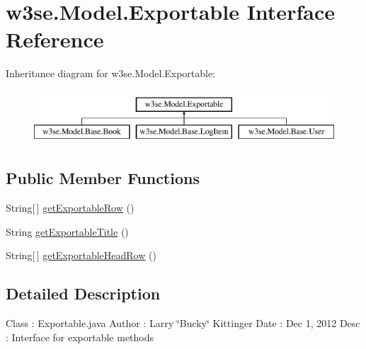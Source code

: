 \hypertarget{interfacew3se_1_1_model_1_1_exportable}{\section{w3se.\-Model.\-Exportable Interface Reference}
\label{interfacew3se_1_1_model_1_1_exportable}
}
Inheritance diagram for w3se.\-Model.\-Exportable\-:\begin{figure}[H]
\begin{center}
\leavevmode
\includegraphics[height=2.000000cm]{interfacew3se_1_1_model_1_1_exportable}
\end{center}
\end{figure}
\subsection*{Public Member Functions}
\begin{DoxyCompactItemize}
\item 
String\mbox{[}$\,$\mbox{]} \hyperlink{interfacew3se_1_1_model_1_1_exportable_a5c6d1c4e7050ec846d6eb1c1ce1a1513}{get\-Exportable\-Row} ()
\item 
String \hyperlink{interfacew3se_1_1_model_1_1_exportable_a7c2a2f98dc37943f09ac83bd86377946}{get\-Exportable\-Title} ()
\item 
String\mbox{[}$\,$\mbox{]} \hyperlink{interfacew3se_1_1_model_1_1_exportable_ad5af5e9be345a7d6e7539ee4347b1524}{get\-Exportable\-Head\-Row} ()
\end{DoxyCompactItemize}


\subsection{Detailed Description}
Class \-: Exportable.\-java Author \-: Larry \char`\"{}\-Bucky\char`\"{} Kittinger Date \-: Dec 1, 2012 Desc \-: Interface for exportable methods 

